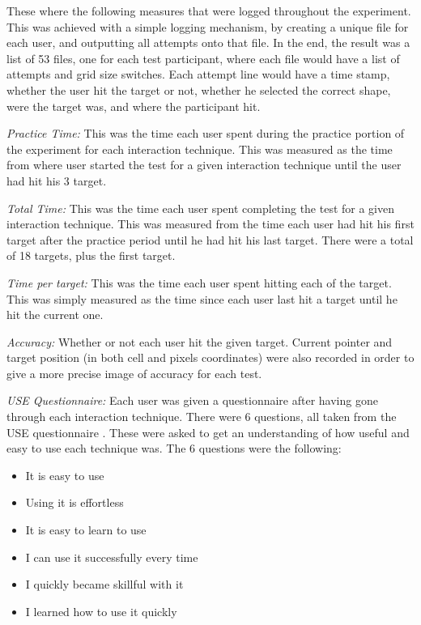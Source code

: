 These where the following measures that were logged throughout the experiment. This was achieved with a simple logging mechanism, by creating a unique file for each user, and outputting all attempts onto that file. In the end, the result was a list of 53 files, one for each test participant, where each file would have a list of attempts and grid size switches. Each attempt line would have a time stamp, whether the user hit the target or not, whether he selected the correct shape, were the target was, and where the participant hit.

\textit{Practice Time:} This was the time each user spent during the practice portion of the experiment for each interaction technique. 
This was measured as the time from where user started the test for a given interaction technique until the user had hit his 3 target. 

\textit{Total Time:} This was the time each user spent completing the test for a given interaction technique. 
This was measured from the time each user had hit his first target after the practice period until he had hit his last target. 
There were a total of 18 targets, plus the first target. 

\textit{Time per target:} This was the time each user spent hitting each of the target. 
This was simply measured as the time since each user last hit a target until he hit the current one.

\textit{Accuracy:} Whether or not each user hit the given target. 
Current pointer and target position (in both cell and pixels coordinates) were also recorded in order to give a more precise image of accuracy for each test. 

\textit{USE Questionnaire:} Each user was given a questionnaire after having gone through each interaction technique. 
There were 6 questions, all taken from the USE questionnaire \cite{lund2001measuring}. 
These were asked to get an understanding of how useful and easy to use each technique was. 
The 6 questions were the following: 

\begin{itemize}
	\item It is easy to use
	\item Using it is effortless
	\item It is easy to learn to use
	\item I can use it successfully every time
	\item I quickly became skillful with it
	\item I learned how to use it quickly
\end{itemize}

